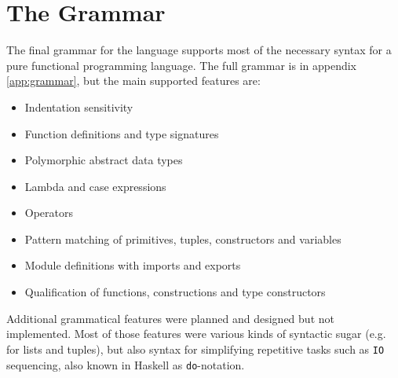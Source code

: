 \section{The Grammar}

The final grammar for the language supports most of the necessary syntax for a pure functional programming language.  The full grammar is in appendix \ref{app:grammar}, but the main supported features are:

\begin{itemize}
  \item Indentation sensitivity
  \item Function definitions and type signatures
  \item Polymorphic abstract data types
  \item Lambda and case expressions
  \item Operators
  \item Pattern matching of primitives, tuples, constructors and variables
  \item Module definitions with imports and exports
  \item Qualification of functions, constructions and type constructors
\end{itemize}

Additional grammatical features were planned and designed but not implemented. Most of those features were various kinds of syntactic sugar (e.g. for lists and tuples), but also syntax for simplifying repetitive tasks such as \texttt{IO} sequencing, also known in Haskell as \texttt{do}-notation.